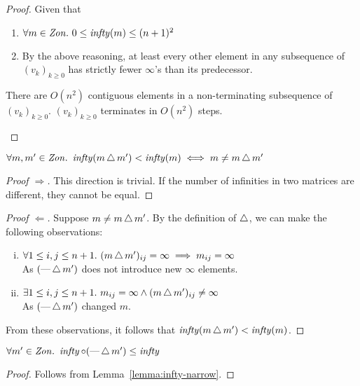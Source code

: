 \begin{prop}
\begin{proof}
    Given that
    \begin{enumerate}[(1)]
      \item $\forall m\in\mathit{Zon}.~0\leq\operatorname{\mathit{infty}}(m)\leq(n+1)^2$
      \item By the above reasoning, at least every other element in any subsequence of $(v_k)_{k\geq0}$ has strictly fewer $\infty$'s than its predecessor.
    \end{enumerate}
    \begin{itemize}
      \step There are $O(n^2)$ contiguous elements in a non-terminating subsequence of $(v_k)_{k\geq0}$.
      \step[\imps] $(v_k)_{k\geq0}$ terminates in $O(n^2)$ steps.\qedhere
    \end{itemize}
  \end{proof}
\end{prop}

\begin{lemma}\label{lemma:infty-narrow}
  $\forall m,m^\prime\in\mathit{Zon}.~\operatorname{\mathit{infty}}(m\operatorname{\triangle} m^\prime)<\operatorname{\mathit{infty}}(m)\iff m\neq m\operatorname{\triangle} m^\prime$
  \begin{proof}[Proof $\Rightarrow$]
    This direction is trivial. If the number of infinities in two matrices are different, they cannot be equal.\qedhere
  \end{proof}

  \begin{proof}[Proof $\Leftarrow$]
    Suppose $m\neq m\operatorname{\triangle} m^\prime$. By the definition of $\operatorname{\triangle}$, we can make the following observations:
    \begin{enumerate}[(i)]
      \item $\forall1\leq i,j\leq n+1.~(m\operatorname{\triangle} m^\prime)_{ij}=\infty\implies m_{ij} = \infty$\\
        As $(\text{---}\operatorname{\triangle} m^\prime)$ does not introduce new $\infty$ elements.
      \item $\exists1\leq i,j\leq n+1.~m_{ij}=\infty\wedge(m\operatorname{\triangle} m^\prime)_{ij}\neq\infty$\\
        As $(\text{---}\operatorname{\triangle} m^\prime)$ changed $m$.
    \end{enumerate}
    From these observations, it follows that $\operatorname{\mathit{infty}}(m\operatorname{\triangle} m^\prime)<\operatorname{\mathit{infty}}(m)$.\qedhere
  \end{proof}
\end{lemma}

\begin{corollary}\label{cor:infty-narrow}
  $\forall m^\prime\in\mathit{Zon}.~\operatorname{\mathit{infty}}\circ(\text{---}\operatorname{\triangle} m^\prime)\leq\operatorname{\mathit{infty}}$
  \begin{proof}
    Follows from Lemma~\ref{lemma:infty-narrow}\qedhere.
  \end{proof}
\end{corollary}

